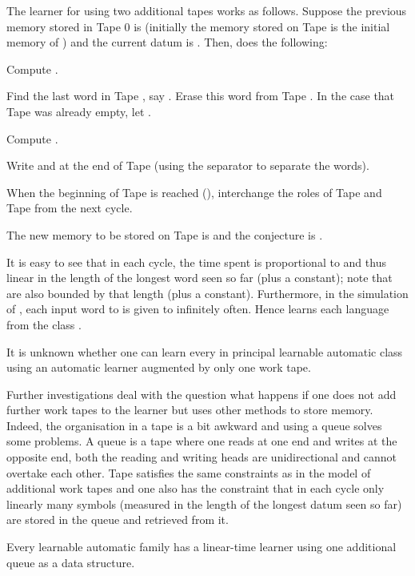 \documentclass{LMCS}
\theoremstyle{plain}\newtheorem{athm}[thm]{Theorem}
\theoremstyle{plain}\newtheorem{aprop}[thm]{Proposition}
\theoremstyle{plain}\newtheorem{aprob}[thm]{Open Problem}
\theoremstyle{plain}\newtheorem{acor}[thm]{Corollary}
\theoremstyle{plain}\newtheorem{alem}[thm]{Lemma}
\theoremstyle{definition}\newtheorem{adefn}[thm]{Definition}
\theoremstyle{definition}\newtheorem{arem}[thm]{Remark}
\theoremstyle{plain}\newtheorem{aexmp}[thm]{Example}
\theoremstyle{plain}\newtheorem{aclm}[thm]{Claim}
\def\niceqed{~~}
\begin{document}
The learner  for  using two additional tapes works as follows.
Suppose the previous memory stored in Tape 0 is  (initially the memory
stored on Tape  is the initial memory of )
and the current datum is . Then,  does the following:
\begin{iteMize}{}
\item Compute .
\item Find the last word in Tape , say . Erase this word from Tape .
      In the case that Tape  was already empty, let .
\item Compute .
\item Write  and  at the end of Tape  (using the separator  to
      separate the words).
\item When the beginning of Tape  is reached (), interchange 
      the roles of Tape  and Tape  from the next cycle.
\item The new memory to be stored on Tape  is  and 
      the conjecture is .
\end{iteMize}
It is easy to see that in each cycle, the time spent is
proportional to  and thus linear in the length
of the longest word seen so far (plus a constant); note that 
 are also bounded
by that length (plus a constant). Furthermore, in the simulation of
, each input word to  is given to  infinitely often.
Hence  learns each language from the class .\niceqed

\begin{oprob}
It is unknown whether one can learn every in principal learnable
automatic class using an automatic learner augmented by only one
work tape.
\end{oprob}


\medskip
\noindent
Further investigations deal with the question what happens if one does
not add further work tapes to the learner but uses other methods to
store memory.
Indeed, the organisation in a tape is a bit awkward and using a queue solves
some problems. A queue is a tape where one reads at one end and writes at the
opposite end, both the reading and writing heads are unidirectional and cannot
overtake each other. Tape  satisfies the same constraints as in the model
of additional work tapes and one also has the constraint that in each cycle
only linearly many symbols (measured in the length of the longest datum seen
so far) are stored in the queue and retrieved from it.

\begin{thm} \label{th:queue}
Every learnable automatic family  has a linear-time learner using
one additional queue as a data structure.
\end{thm}
\end{document}
